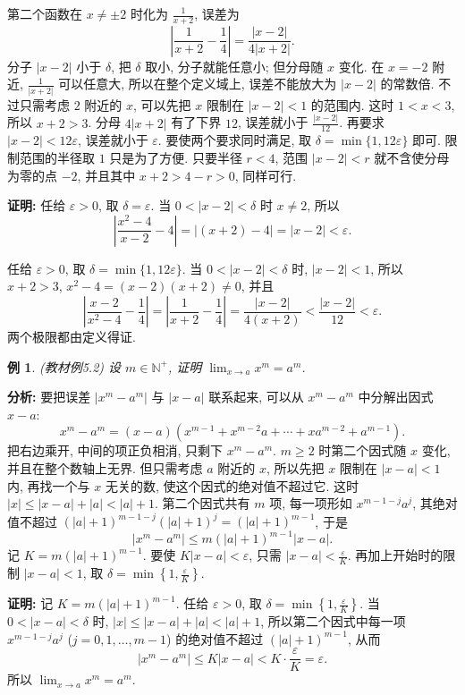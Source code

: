 \documentclass[UTF8,openany]{ctexbook}
\theoremstyle{chinesetextbook}
\newtheorem{example}{例}[section]
\newenvironment{cnproof}{\par\indent\textbf{证明:} \ignorespaces}{\par}
\begin{document}
第二个函数在 $x\ne\pm2$ 时化为 $\displaystyle\frac1{x+2}$, 误差为
\[
\left|\frac1{x+2}-\frac14\right|=\frac{|x-2|}{4|x+2|}.
\]
分子 $|x-2|$ 小于 $\delta$, 把 $\delta$ 取小, 分子就能任意小; 但分母随 $x$ 变化. 在 $x=-2$ 附近, $\displaystyle\frac1{|x+2|}$ 可以任意大, 所以在整个定义域上, 误差不能放大为 $|x-2|$ 的常数倍. 不过只需考虑 $2$ 附近的 $x$, 可以先把 $x$ 限制在 $|x-2|<1$ 的范围内. 这时 $1<x<3$, 所以 $x+2>3$. 分母 $4|x+2|$ 有了下界 $12$, 误差就小于 $\displaystyle\frac{|x-2|}{12}$. 再要求 $|x-2|<12\varepsilon$, 误差就小于 $\varepsilon$. 要使两个要求同时满足, 取 $\delta=\min\{1,12\varepsilon\}$ 即可. 限制范围的半径取 $1$ 只是为了方便. 只要半径 $r<4$, 范围 $|x-2|<r$ 就不含使分母为零的点 $-2$, 并且其中 $x+2>4-r>0$, 同样可行.
\begin{cnproof}
任给 $\varepsilon>0$, 取 $\delta=\varepsilon$. 当 $0<|x-2|<\delta$ 时 $x\ne2$, 所以
\[
\left|\frac{x^2-4}{x-2}-4\right|=|(x+2)-4|=|x-2|<\varepsilon.
\]

任给 $\varepsilon>0$, 取 $\delta=\min\{1,12\varepsilon\}$. 当 $0<|x-2|<\delta$ 时, $|x-2|<1$, 所以 $x+2>3$, $x^2-4=(x-2)(x+2)\ne0$, 并且
\[
\left|\frac{x-2}{x^2-4}-\frac14\right|=\left|\frac1{x+2}-\frac14\right|=\frac{|x-2|}{4(x+2)}<\frac{|x-2|}{12}<\varepsilon.
\]
两个极限都由定义得证.
\end{cnproof}
\begin{example}\label{ex:5-2}
\textnormal{(教材例5.2)} 设 $m\in\mathbb N^+$, 证明 $\displaystyle\lim_{x\to a}x^m=a^m$.
\end{example}
\par\indent\textbf{分析:} 要把误差 $|x^m-a^m|$ 与 $|x-a|$ 联系起来, 可以从 $x^m-a^m$ 中分解出因式 $x-a$:
\[
x^m-a^m=(x-a)\left(x^{m-1}+x^{m-2}a+\cdots+xa^{m-2}+a^{m-1}\right).
\]
把右边乘开, 中间的项正负相消, 只剩下 $x^m-a^m$. $m\ge2$ 时第二个因式随 $x$ 变化, 并且在整个数轴上无界. 但只需考虑 $a$ 附近的 $x$, 所以先把 $x$ 限制在 $|x-a|<1$ 内, 再找一个与 $x$ 无关的数, 使这个因式的绝对值不超过它. 这时 $|x|\le|x-a|+|a|<|a|+1$. 第二个因式共有 $m$ 项, 每一项形如 $x^{m-1-j}a^j$, 其绝对值不超过 $(|a|+1)^{m-1-j}(|a|+1)^j=(|a|+1)^{m-1}$, 于是
\[
|x^m-a^m|\le m(|a|+1)^{m-1}|x-a|.
\]
记 $K=m(|a|+1)^{m-1}$. 要使 $K|x-a|<\varepsilon$, 只需 $\displaystyle|x-a|<\frac\varepsilon K$. 再加上开始时的限制 $|x-a|<1$, 取 $\displaystyle\delta=\min\left\{1,\frac\varepsilon K\right\}$.
\begin{cnproof}
记 $K=m(|a|+1)^{m-1}$. 任给 $\varepsilon>0$, 取 $\displaystyle\delta=\min\left\{1,\frac\varepsilon K\right\}$. 当 $0<|x-a|<\delta$ 时, $|x|\le|x-a|+|a|<|a|+1$, 所以第二个因式中每一项 $x^{m-1-j}a^j$ ($j=0,1,\ldots,m-1$) 的绝对值不超过 $(|a|+1)^{m-1}$, 从而
\[
|x^m-a^m|\le K|x-a|<K\cdot\frac\varepsilon K=\varepsilon.
\]
所以 $\displaystyle\lim_{x\to a}x^m=a^m$.
\end{cnproof}
\end{document}
